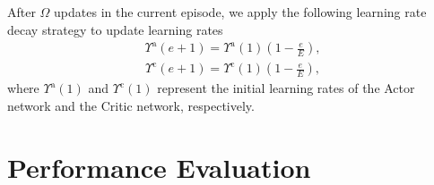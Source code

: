 \documentclass[10pt,journal,compsoc]{IEEEtran}
\begin{document}
After $\Omega$ updates in the current episode, we apply the following learning rate decay strategy to update learning rates
\begin{align}\label{c5:actor-decay-rate}
\Upsilon^{\text{a}}(e + 1) = \Upsilon^{\text{a}}(1)\left(1-\frac{e}{E}\right),
\end{align}
\begin{align}\label{c5:critic-decay-rate}
\Upsilon^{\text{c}}(e + 1) = \Upsilon^{\text{c}}(1)\left(1-\frac{e}{E}\right),
\end{align}
where $\Upsilon^{\text{a}}(1)$ and $\Upsilon^{\text{c}}(1)$ represent the initial learning rates of the Actor network and the Critic network, respectively.

\section{Performance Evaluation}\label{sec: Performance Evaluation}
\end{document}
